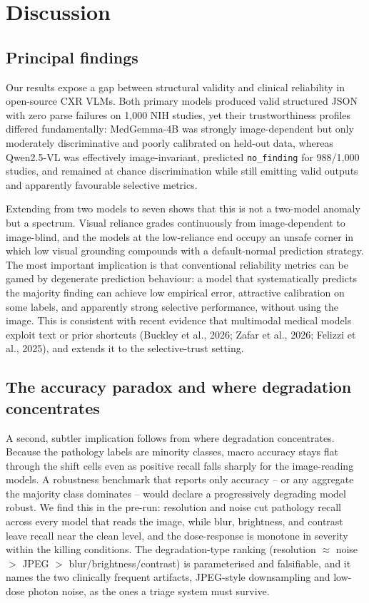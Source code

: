 \section{Discussion}

\subsection{Principal findings}

Our results expose a gap between structural validity and clinical reliability in open-source CXR VLMs. Both primary models produced valid structured JSON with zero parse failures on 1,000 NIH studies, yet their trustworthiness profiles differed fundamentally: MedGemma-4B was strongly image-dependent but only moderately discriminative and poorly calibrated on held-out data, whereas Qwen2.5-VL was effectively image-invariant, predicted \texttt{no\_finding} for 988/1,000 studies, and remained at chance discrimination while still emitting valid outputs and apparently favourable selective metrics.

Extending from two models to seven shows that this is not a two-model anomaly but a spectrum. Visual reliance grades continuously from image-dependent to image-blind, and the models at the low-reliance end occupy an unsafe corner in which low visual grounding compounds with a default-normal prediction strategy. The most important implication is that conventional reliability metrics can be gamed by degenerate prediction behaviour: a model that systematically predicts the majority finding can achieve low empirical error, attractive calibration on some labels, and apparently strong selective performance, without using the image. This is consistent with recent evidence that multimodal medical models exploit text or prior shortcuts (Buckley et al., 2026; Zafar et al., 2026; Felizzi et al., 2025), and extends it to the selective-trust setting.

\subsection{The accuracy paradox and where degradation concentrates}

A second, subtler implication follows from where degradation concentrates. Because the pathology labels are minority classes, macro accuracy stays flat through the shift cells even as positive recall falls sharply for the image-reading models. A robustness benchmark that reports only accuracy -- or any aggregate the majority class dominates -- would declare a progressively degrading model robust. We find this in the pre-run: resolution and noise cut pathology recall across every model that reads the image, while blur, brightness, and contrast leave recall near the clean level, and the dose-response is monotone in severity within the killing conditions. The degradation-type ranking (resolution $\approx$ noise $>$ JPEG $>$ blur/brightness/contrast) is parameterised and falsifiable, and it names the two clinically frequent artifacts, JPEG-style downsampling and low-dose photon noise, as the ones a triage system must survive.

